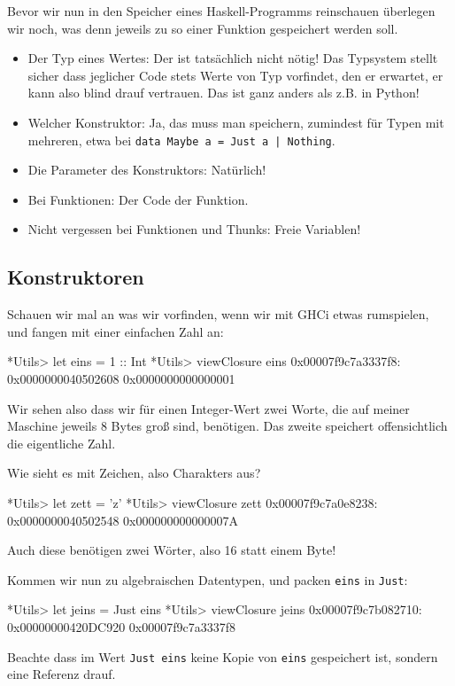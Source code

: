 \documentclass[11pt,DIV=12,parskip=half,headings=normal,abstract]{scrartcl}
\newcommand{\li}{\lstinline[style=haskell]}
\begin{document}
Bevor wir nun in den Speicher eines Haskell-Programms reinschauen überlegen wir noch, was denn jeweils zu so einer Funktion gespeichert werden soll.
\begin{itemize}
\item Der Typ eines Wertes: Der ist tatsächlich nicht nötig! Das Typsystem stellt sicher dass jeglicher Code stets Werte von Typ vorfindet, den er erwartet, er kann also blind drauf vertrauen. Das ist ganz anders als z.B. in Python!
\item Welcher Konstruktor: Ja, das muss man speichern, zumindest für Typen mit mehreren, etwa bei \li-data Maybe a = Just a | Nothing-.
\item Die Parameter des Konstruktors: Natürlich!
\item Bei Funktionen: Der Code der Funktion.
\item Nicht vergessen bei Funktionen und Thunks: Freie Variablen!
\end{itemize}

\subsection{Konstruktoren}

Schauen wir mal an was wir vorfinden, wenn wir mit GHCi etwas rumspielen, und fangen mit einer einfachen Zahl an:
\begin{ghci}
*Utils> let eins = 1 :: Int
*Utils> viewClosure eins
0x00007f9c7a3337f8: 0x0000000040502608 0x0000000000000001
\end{ghci}

Wir sehen also dass wir für einen Integer-Wert zwei Worte, die auf meiner Maschine jeweils 8 Bytes groß sind, benötigen. Das zweite speichert offensichtlich die eigentliche Zahl.

Wie sieht es mit Zeichen, also Charakters aus?
\begin{ghci}
*Utils> let zett = 'z'
*Utils> viewClosure zett
0x00007f9c7a0e8238: 0x0000000040502548 0x000000000000007A
\end{ghci}
Auch diese benötigen zwei Wörter, also 16 statt einem Byte! 

Kommen wir nun zu algebraischen Datentypen, und packen \li-eins- in \li-Just-:
\begin{ghci}
*Utils> let jeins = Just eins
*Utils> viewClosure jeins
0x00007f9c7b082710: 0x00000000420DC920 0x00007f9c7a3337f8
\end{ghci}

Beachte dass im Wert \li-Just eins- keine Kopie von \li-eins- gespeichert ist, sondern eine Referenz drauf.
\end{document}
